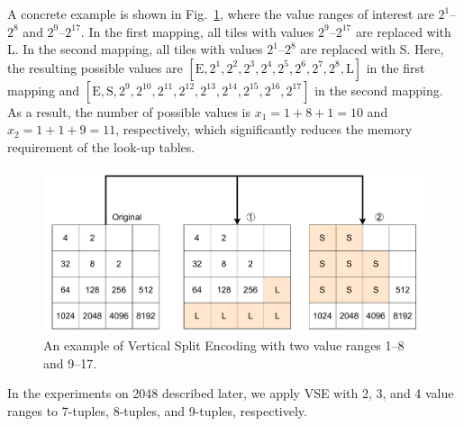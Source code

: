 A concrete example is shown in Fig.~\ref{fig:VSE-example}, where the value ranges of interest are $2^1$--$2^8$ and $2^9$--$2^{17}$.
In the first mapping, all tiles with values $2^{9}$--$2^{17}$ are replaced with L.
In the second mapping, all tiles with values $2^{1}$–$2^{8}$ are replaced with S.
Here, the resulting possible values are $[\mbox{E}, 2^1, 2^2, 2^3, 2^4, 2^5, 2^6, 2^7, 2^8, \mbox{L}]$ in the first mapping and $[\mbox{E}, \mbox{S}, 2^9, 2^{10}, 2^{11}, 2^{12}, 2^{13}, 2^{14}, 2^{15}, 2^{16}, 2^{17}]$ in the second mapping.
As a result, the number of possible values is $x_1 = 1 + 8 + 1 = 10$ and $x_2 = 1 + 1 + 9 = 11$, respectively, which significantly reduces the memory requirement of the look-up tables.

\begin{figure}
 \includegraphics[width=.9\linewidth]{figures/VSE-example.pdf}
 \caption{An example of Vertical Split Encoding with two value ranges 1--8 and 9--17.}
 \label{fig:VSE-example}
\end{figure}


In the experiments on 2048 described later, we apply VSE with 2, 3, and 4 value ranges to 7-tuples, 8-tuples, and 9-tuples, respectively.
